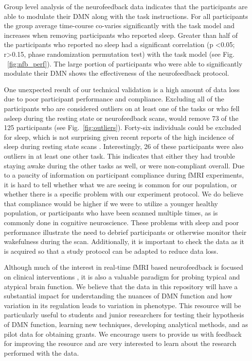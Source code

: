Group level analysis of the neurofeedback data indicates that the participants are able to modulate their DMN along with the task instructions. For all participants the group average time-course co-varies significantly with the task model and increases when removing participants who reported sleep. Greater than half of the  participants who reported no sleep had a  significant correlation (p \textless 0.05; r\textgreater 0.15, phase randomization permutation test) with the task model (see Fig. ~\ref{fig:nfb_perf}). The large portion of participants who were able to significantly modulate their DMN shows the effectiveness of the neurofeedback protocol.

One unexpected result of our technical validation is a high amount of data loss due to poor participant performance and compliance. Excluding all of the participants who are considered outliers on at least one of the tasks or who fell asleep during the resting state or neurofeedback scans, would remove 73 of the 125 participants (see Fig.~\ref{fig:outliers}). Forty-six individuals could be excluded for sleep, which is not surprising given recent reports of the high incidence of sleep during resting state scans \cite{Tagliazucchi2014}. Interestingly, 26 of these participants were also outliers in at least one other task. This indicates that either they had trouble staying awake during the other tasks as well, or were non-compliant overall. Due to a paucity of information on participant compliance during fMRI experiments, it is hard to tell whether what we are seeing is common for our population, or whether there is a specific problem with our experiment protocol. We do believe that compliance would be higher if we were to utilize a younger healthy population, or participants who have been scanned multiple times, as is commonly done in cognitive neuroscience. These problems with sleep and poor performance illustrate the need to debrief participants or otherwise monitor their wakefulness during the scan. Additionally, it is important to check the data as it is acquired so that a study protocol can be adapted to reduce data loss.

Although much of the interest in real-time fMRI based neurofeedback is focused on clinical interventions \cite{Stoeckel2014}, it is also a valuable paradigm for probing typical and atypical brain function. We believe that the data in this repository will have a substantial impact for understanding the nuances of DMN function and how variation in its regulation leads to variation in phenotype. This resource will be particularly useful to students and junior researchers for testing their hypothesis of DMN function, learning new techniques, developing analytical methods, and as pilot data for obtaining grants. We encourage users to provide us with feedback for improving the resource and are very interested to learn about the research performed with the data.